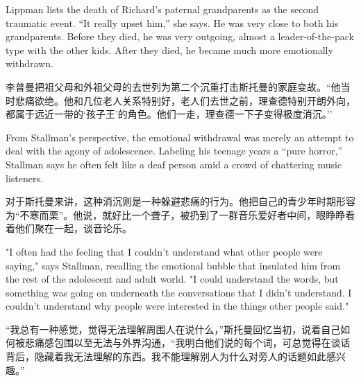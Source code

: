 \ifdefined\eng
Lippman lists the death of Richard's paternal grandparents as the second traumatic event. ``It really upset him,'' she says. He was very close to both his grandparents. Before they died, he was very outgoing, almost a leader-of-the-pack type with the other kids. After they died, he became much more emotionally withdrawn.
\fi

\ifdefined\chs
李普曼把祖父母和外祖父母的去世列为第二个沉重打击斯托曼的家庭变故。``他当时悲痛欲绝。他和几位老人关系特别好，老人们去世之前，理查德特别开朗外向，都属于远近一带的`孩子王'的角色。他们一走，理查德一下子变得极度消沉。''
\fi

\ifdefined\eng
From Stallman's perspective, the emotional withdrawal was merely an attempt to deal with the agony of adolescence. Labeling his teenage years a ``pure horror,'' Stallman says he often felt like a deaf person amid a crowd of chattering music listeners.
\fi

\ifdefined\chs
对于斯托曼来讲，这种消沉则是一种躲避悲痛的行为。他把自己的青少年时期形容为``不寒而栗''。他说，就好比一个聋子，被扔到了一群音乐爱好者中间，眼睁睁看着他们聚在一起，谈音论乐。
\fi

\ifdefined\eng
"I often had the feeling that I couldn't understand what other people were saying," says Stallman, recalling the emotional bubble that insulated him from the rest of the adolescent and adult world. "I could understand the words, but something was going on underneath the conversations that I didn't understand. I couldn't understand why people were interested in the things other people said."

\fi

\ifdefined\chs
``我总有一种感觉，觉得无法理解周围人在说什么，''斯托曼回忆当初，说着自己如何被悲痛感包围以至无法与外界沟通，``我明白他们说的每个词，可总觉得在谈话背后，隐藏着我无法理解的东西。我不能理解别人为什么对旁人的话题如此感兴趣。''
\fi

